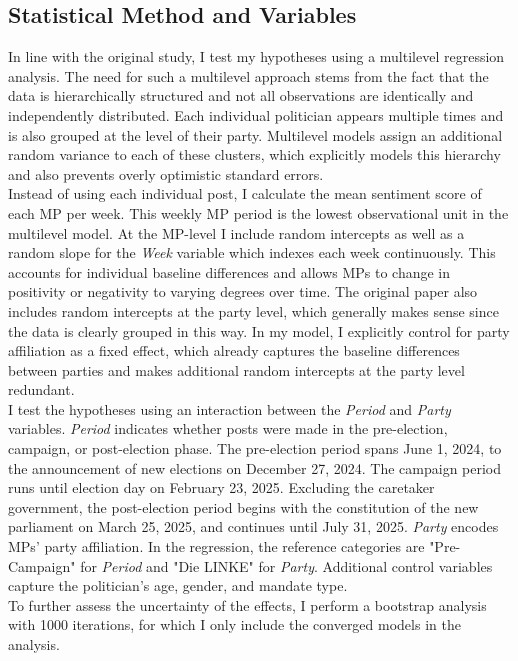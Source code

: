 \documentclass{article}
\begin{document}
\subsection{Statistical Method and Variables}
In line with the original study, I test my hypotheses using a multilevel regression analysis. The need for such a multilevel approach stems from the fact that the data is hierarchically structured and not all observations are identically and independently distributed. Each individual politician appears multiple times and is also grouped at the level of their party. Multilevel models assign an additional random variance to each of these clusters, which explicitly models this hierarchy and also prevents overly optimistic standard errors. \\
\noindent Instead of using each individual post, I calculate the mean sentiment score of each MP per week. This weekly MP period is the lowest observational unit in the multilevel model. At the MP-level I include random intercepts as well as a random slope for the \textit{Week} variable which indexes each week continuously. This accounts for individual baseline differences and allows MPs to change in positivity or negativity to varying degrees over time. The original paper also includes random intercepts at the party level, which generally makes sense since the data is clearly grouped in this way. In my model, I explicitly control for party affiliation as a fixed effect, which already captures the baseline differences between parties and makes additional random intercepts at the party level redundant. \\
\noindent I test the hypotheses using an interaction between the \textit{Period} and \textit{Party} variables. \textit{Period} indicates whether posts were made in the pre-election, campaign, or post-election phase. The pre-election period spans June 1, 2024, to the announcement of new elections on December 27, 2024. The campaign period runs until election day on February 23, 2025. Excluding the caretaker government, the post-election period begins with the constitution of the new parliament on March 25, 2025, and continues until July 31, 2025. \textit{Party} encodes MPs’ party affiliation. In the regression, the reference categories are "Pre-Campaign" for \textit{Period} and "Die LINKE" for \textit{Party}. Additional control variables capture the politician’s age, gender, and mandate type. \\
\noindent To further assess the uncertainty of the effects, I perform a bootstrap analysis with 1000 iterations, for which I only include the converged models in the analysis.
\end{document}
